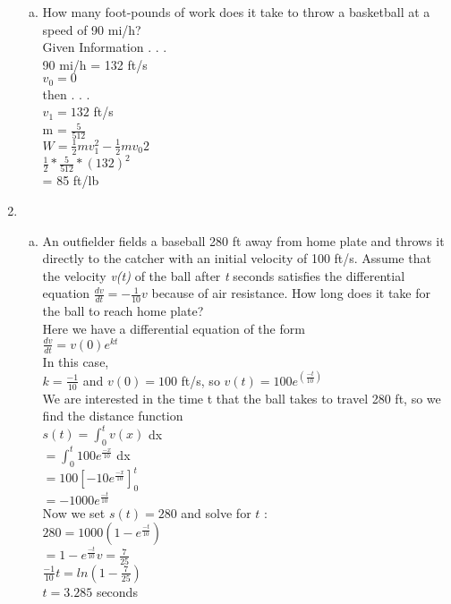 \documentclass[paper=a4, fontsize=11pt]{scrartcl}
\numberwithin{equation}{section}
\numberwithin{figure}{section}
\numberwithin{table}{section}
\begin{document}
\begin{enumerate}[1.]
\begin{enumerate}[(a)]
			\item How many foot-pounds of work does it take to throw a basketball at a speed of 90 mi/h? \\
			Given Information . . .\\
			90 mi/h = 132 ft/s\\
			$v_{0} =  0$\\
			then . . . \\ 
			$v_{1} = 132$ ft/s\\ 
			m = $\frac{5}{512}$\\
			$W = \frac{1}{2}mv_{1}^{2} - \frac{1}{2}mv_{0}{2}$\\
			$\frac{1}{2} * \frac{5}{512} * (132)^2 $\\
			= 85 ft/lb
		\end{enumerate}
	\item 
		\begin{enumerate}[(a)]
		\item An outfielder fields a baseball 280 ft away from home plate and throws it directly to the catcher with an initial velocity of 100 ft/s. Assume that the velocity \textit{v(t)} of the ball after \textit{t} seconds satisfies the differential equation $\frac{dv}{dt} = -\frac{1}{10}v$ because of air resistance. How long does it take for the ball to reach home plate? \\
		Here we have a differential equation of the form \\
		$\frac{dv}{dt} = v(0)e^{kt}$\\
		In this case, \\
		$k = \frac{-1}{10} $ and $v(0) = 100$ ft/s, so $v(t) = 100e^(\frac{-t}{10})$ \\
		We are interested in the time t that the ball takes to travel 280 ft, so we find the distance function\\
		$ s(t) = \int_{0}^{t} v(x)$ dx\\
		$ = \int_{0}^{t} 100e^\frac{-x}{10}$ dx\\
		$ = 100[-10e^\frac{-x}{10}]_{0}^{t}$\\
		$ = -1000e^\frac{-t}{10}$\\
		Now we set $s(t) = 280 $ and solve for $t$ : \\
		$ 280 = 1000(1-e^\frac{-t}{10})$\\
		$ = 1 - e^\frac{-t}{10}v= \frac{7}{25} $\\
		$ \frac{-1}{10} t = ln(1-\frac{7}{25}) $\\
		$ t = 3.285 $ seconds \\
	

\end{enumerate}
\end{enumerate}
\end{document}
